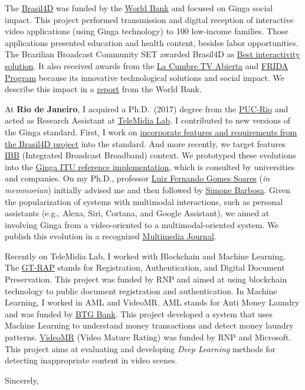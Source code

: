 \documentclass[10pt,a4paper,sans,colorlinks]{moderncv}
\begin{document}
The \href{http://www.ebc.com.br/brasil-4d}{Brasil4D} was funded by the \href{https://www.worldbank.org/}{World Bank} and focused on Ginga social impact.
This project performed transmission and digital reception of interactive video applications (using Ginga technology) to 100 low-income families.
Those applications presented education and health content, besides labor opportunities.
The Brazilian Broadcast Community SET awarded Brasil4D as \href{http://set.org.br/artigos/ed137/137_revistadaset_70.pdf}{Best interactivity solution}.
It also received awards from the \href{https://www.premiotv.com/es/ganadores-es/ganadores-2013-es}{La Cumbre TV Abierta} and \href{https://programafrida.net/archivos/project/brasil-4d}{FRIDA Program} because its innovative technological solutions and social impact.
We describe this impact in a  \href{http://documents.worldbank.org/curated/en/232621468230956108/pdf/809560WP0PORTU0Box0379824B00PUBLIC0.pdf}{report} from the World Bank.

At \textbf{Rio de Janeiro}, I acquired a Ph.D.~(2017) degree from the \href{http://www.inf.puc-rio.br/}{PUC-Rio} and acted as Research Assistant at \href{http://telemidia.puc-rio.br/}{TeleMidia Lab}.
I contributed to new versions of the Ginga standard.
First, I work on \href{https://www.abntcatalogo.com.br/norma.aspx?
  ID=361857#}{incorporate features and requirements from the Brasil4D project} into the standard.
And more recently, we target features \href{http://www.freepatentsonline.com/y2016/0234533.html}{IBB} (Integrated Broadcast Broadband) context.
We prototyped these evolutions into the  \href{https://github.com/TeleMidia/ginga}{Ginga ITU reference implementation}, which is consulted by universities and companies.
On my Ph.D., professor \href{https://www.researchgate.net/profile/Luiz_Fernando_Soares}{Luiz Fernando Gomes Soares} (\textit{in memmorian}) initially advised me and then followed by  \href{https://www.linkedin.com/in/simonedjb/}{Simone Barbosa}.
Given the popularization of systems with multimodal interactions, such as personal assistants (e.g., Alexa, Siri, Cortana, and Google Assistant), we aimed at involving Ginga from a video-oriented to a multimodal-oriented system.
We publish this evolution in a recognized \href{https://link.springer.com/article/10.1007\%2Fs11042-016-3846-8}{Multimedia Journal}.

Recently on TeleMidia Lab, I worked with Blockchain and Machine Learning.
The \href{http://wrnp.rnp.br/sites/wrnp2017/files/02_wrnp2017_poster_gt-sap_design.pdf}{GT-RAP} stands for Registration, Authentication, and Digital Document Preservation.
This project was funded by RNP and aimed at using blockchain technology to public document registration and authentication.
In Machine Learning, I worked in AML and VideoMR.
AML stands for Anti Money Laundry and was funded by \href{https://www.btgpactual.com/}{BTG
Bank}.
This project developed a system that uses Machine Learning to understand money transactions and detect money laundry patterns.
\href{https://www.rnp.br/en/rnp-and-microsoft-challenge-artificial-intelligence}{VideoMR} (Video Mature Rating) was funded by RNP and Microsoft.
This project aims at evaluating and developing \textit{Deep Learning} methods for detecting inappropriate content in video scenes.

\vspace{1em}
\raggedright
Sincerely, \myname
\end{document}

